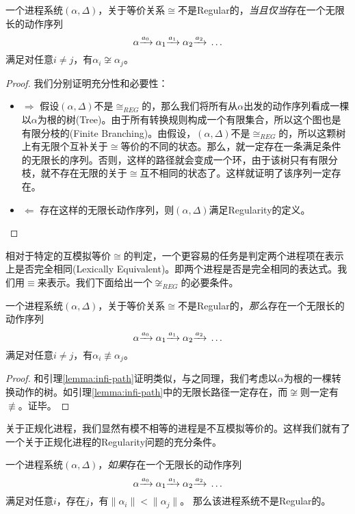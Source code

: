 \begin{lem}\label{lemma:infi-path}
一个进程系统$(\alpha,\Delta)$，关于等价关系$\cong$不是Regular的，\emph{当且仅当}存在一个无限长的动作序列
$$\alpha{\xrightarrow{a_0}{}}\alpha_1{\xrightarrow{a_1}{}}\alpha_2{\xrightarrow{a_2}{}}\ldots$$ 
满足对任意$i\neq j$，有$\alpha_i\not\cong\alpha_j$。
\end{lem}

\begin{proof}
我们分别证明充分性和必要性：
\begin{itemize}
	\item $\Rightarrow$ 假设$(\alpha,\Delta)$不是$\cong_{REG}$的，那么我们将所有从$\alpha$出发的动作序列看成一棵以$\alpha$为根的树(Tree)。由于所有转换规则构成一个有限集合，所以这个图也是有限分枝的(Finite Branching)。由假设，$(\alpha,\Delta)$不是$\cong_{REG}$的，所以这颗树上有无限个互补关于$\cong$等价的不同的状态。那么，就一定存在一条满足条件的无限长的序列。否则，这样的路径就会变成一个环，由于该树只有有限分枝，就不存在无限的关于$\cong$互不相同的状态了。这样就证明了该序列一定存在。
	\item $\Leftarrow$ 存在这样的无限长动作序列，则$(\alpha,\Delta)$满足Regularity的定义。
\end{itemize}
\end{proof}

相对于特定的互模拟等价$\cong$的判定，一个更容易的任务是判定两个进程项在表示上是否完全相同(Lexically Equivalent)。即两个进程是否是完全相同的表达式。我们用$\equiv$来表示。我们下面给出一个$\not\cong_{REG}$的必要条件。

\begin{lem}\label{lemma:infi-path-2}
一个进程系统$(\alpha,\Delta)$，关于等价关系$\cong$不是Regular的，\emph{那么}存在一个无限长的动作序列
$$\alpha{\xrightarrow{a_0}{}}\alpha_1{\xrightarrow{a_1}{}}\alpha_2{\xrightarrow{a_2}{}}\ldots$$ 
满足对任意$i\neq j$，有$\alpha_i\not\equiv\alpha_j$。
\end{lem}

\begin{proof}
和引理\ref{lemma:infi-path}证明类似，与之同理，我们考虑以$\alpha$为根的一棵转换动作的树。如引理\ref{lemma:infi-path}中的无限长路径一定存在，而$\not\cong$则一定有$\not\equiv$。证毕。
\end{proof}

关于正规化进程，我们显然有模不相等的进程是不互模拟等价的。这样我们就有了一个关于正规化进程的Regularity问题的充分条件。

\begin{lem}\label{lemma:infi-path-3}
一个进程系统$(\alpha,\Delta)$，\emph{如果}存在一个无限长的动作序列
$$\alpha{\xrightarrow{a_0}{}}\alpha_1{\xrightarrow{a_1}{}}\alpha_2{\xrightarrow{a_2}{}}\ldots$$ 
满足对任意$i$，存在$j$，有$\|\alpha_i\|<\|\alpha_j\|$。
那么该进程系统不是Regular的。
\end{lem}

